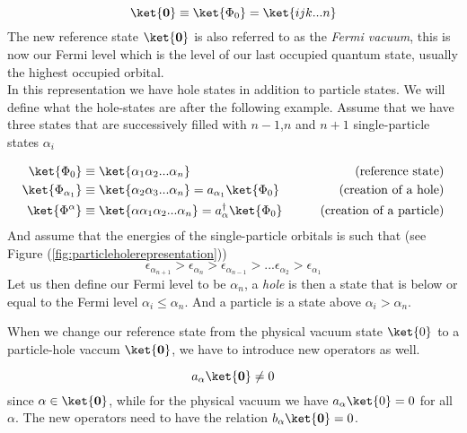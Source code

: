 \begin{equation}
\ket{\bf 0} \equiv \ket{\Phi_0} = \ket{ijk...n} 
 \label{def:referencestate}
\end{equation}
%
The new reference state $\ket{\bf 0}$ is also referred to as the \emph{Fermi vacuum}, this is now our Fermi level which is the level of our last occupied quantum state, usually the highest occupied orbital.
\\
In this representation we have hole states in addition to particle states. We will define what the hole-states are after the following example. Assume that we have three states that are successively filled with $n-1$,$n$ and $n+1$ single-particle states $\alpha_i$

\begin{align}
\ket{\Phi_0} &\equiv \ket{\alpha_1\alpha_2...\alpha_{n}} &\qquad \text{(reference state)} \label{def:reference state} \\
\ket{\Phi_{\alpha_1}} &\equiv \ket{\alpha_2\alpha_3...\alpha_{n}} = a_{\alpha_1} \ket{\Phi_0} &\qquad \text{(creation of a hole)} \label{def:creation of a hole} \\
\ket{\Phi^{\alpha}} &\equiv \ket{\alpha\alpha_1\alpha_2...\alpha_{n}} = a_{\alpha}^{\dagger} \ket{\Phi_0} &\qquad \text{(creation of a particle)}
 \label{def:creation of a particle}
\end{align}
%
And assume that the energies of the single-particle orbitals is such that (see Figure (\ref{fig:particleholerepresentation}))
\begin{equation} \epsilon_{\alpha_{n+1}}>\epsilon_{\alpha_n}>\epsilon_{\alpha_{n-1}}>...\epsilon_{\alpha_{2}}>\epsilon_{\alpha_{1}}
 \label{def:singleparticleenergies} 
\end{equation}
%
Let us then define our Fermi level to be $\alpha_n$, a \emph{hole} is then a state that is below or equal to the Fermi level $\alpha_i \leq \alpha_n$. And a particle is a state above $\alpha_i > \alpha_n$. 

When we change our reference state from the physical vacuum state $\ket{0}$ to a particle-hole vaccum $\ket{\bf 0}$, we have to introduce new operators as well. 

\begin{equation}
a_{\alpha} \ket{\bf 0} \neq 0 
 \label{show:neednewoperators}
\end{equation}
%
since $\alpha \in \ket{\bf 0}$, while for the physical vacuum we have $a_\alpha \ket{0} = 0$ for all $\alpha$. The new operators need to have the relation $b_\alpha\ket{\bf 0} = 0$.

